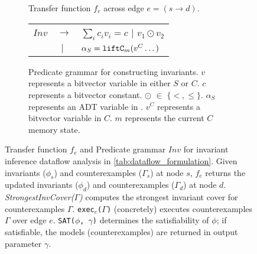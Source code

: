 \begin{figure}[H]
\begin{center}
\begin{subfigure}{.58\textwidth}
\begin{algorithm}[H]
\begin{footnotesize}
\SetAlgoLined
{}
\end{footnotesize}
\end{algorithm}
\caption{\label{algo:tf} Transfer function $f_e$ across
edge $e=(s\rightarrow d)$.}
\end{subfigure}%
\hfill
{}
\hfill
\begin{subfigure}{.40\textwidth}
\begin{center}
\begin{footnotesize}
\begin{tabular}{p{0.45cm}p{0.15cm}l}
${Inv}$ & $\rightarrow$ & $\sum_{i}{c_i v_i}=c$ $|$ $v_1 \odot v_2$  \\
& $\ \ |$ & $\alpha_S = {\tt liftC}_m(v^C \dots)$ \\
\end{tabular}
\end{footnotesize}
\end{center}
\vspace{-10px}
\caption{\label{fig:invGrammar}\footnotesize Predicate grammar for constructing invariants. $v$ represents a bitvector variable in either $S$ or $C$. $c$ represents a bitvector constant. $\odot$ $\in$ $\{<,\leq\}$. $\alpha_S$ represents an ADT variable in \SpecL{}. $v^{C}$ represents a bitvector variable in $C$. $m$ represents the current $C$ memory state.}
\end{subfigure}%
\caption{Transfer function $f_e$ and Predicate grammar $Inv$ for invariant inference dataflow analysis in \cref{tab:dataflow_formulation}.
Given invariants ($\phi_{s}$) and counterexamples ($\Gamma_{s}$) at node $s$,
$f_e$ returns the updated
invariants ($\phi_{d}$) and counterexamples ($\Gamma_{d}$) at
node $d$.
{\em StrongestInvCover($\Gamma$)} computes the strongest invariant cover for counterexamples $\Gamma$.
{\tt exec$_e$($\Gamma$)} (concretely) executes
counterexamples $\Gamma$ over edge $e$.
{\tt SAT($\phi$, $\gamma$)} determines
the satisfiability of $\phi$; if satisfiable, the models (counterexamples) are returned in output parameter $\gamma$.}
\end{center}
\end{figure}